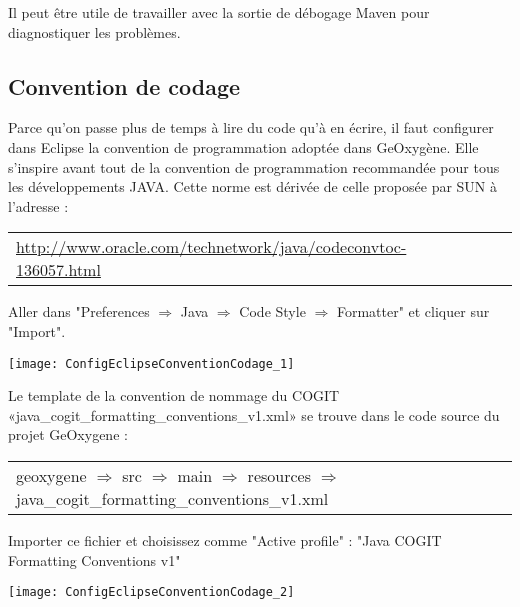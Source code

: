 Il peut être utile de travailler avec la sortie de débogage Maven pour diagnostiquer les problèmes.




\subsection{Convention de codage}

Parce qu'on passe plus de temps à lire du code qu’à en écrire, il faut configurer dans Eclipse la convention de programmation adoptée dans GeOxygène. Elle s'inspire avant tout de la convention de programmation recommandée pour tous les développements JAVA. Cette norme est dérivée de celle proposée par SUN à l’adresse :

\begin{tabular}[!t]{llll}
{\href{http://www.oracle.com/technetwork/java/codeconvtoc-136057.html}{http://www.oracle.com/technetwork/java/codeconvtoc-136057.html}}  
\end{tabular}

\noindent
Aller dans "Preferences $\Rightarrow$ Java $\Rightarrow$ Code Style $\Rightarrow$ Formatter" et cliquer sur "Import". 

\begin{center}
\texttt{[image: ConfigEclipseConventionCodage\_1]}
\end{center}

\noindent
Le template de la convention de nommage du COGIT «java\_cogit\_formatting\_conventions\_v1.xml» se trouve dans le code source du projet GeOxygene :

\begin{tabular}[!t]{llll}
geoxygene $\Rightarrow$  src $\Rightarrow$  main $\Rightarrow$  resources $\Rightarrow$  java\_cogit\_formatting\_conventions\_v1.xml
\end{tabular}

\smallskip

\noindent
Importer ce fichier et choisissez comme "Active profile" : "Java COGIT Formatting Conventions v1" 

\begin{center}
\texttt{[image: ConfigEclipseConventionCodage\_2]}
\end{center}






